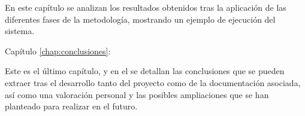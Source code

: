 \begin{definitionlist}
En este capítulo se analizan los resultados obtenidos tras la aplicación de las diferentes fases de la metodología, mostrando un ejemplo de ejecución del sistema.

\item[Capítulo \ref{chap:conclusiones}:\nameref{chap:conclusiones}]

Este es el último capítulo, y en el se detallan las conclusiones que se pueden extraer tras el desarrollo tanto del proyecto como de la documentación asociada, así como una valoración personal y las posibles ampliaciones que se han planteado para realizar en el futuro.

\end{definitionlist}



